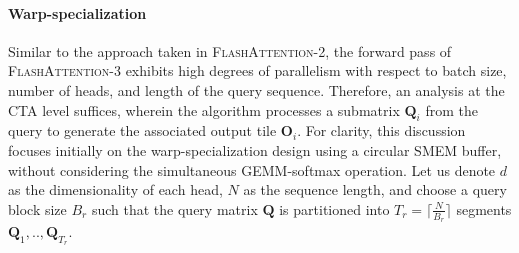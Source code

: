 \paragraph{Warp-specialization}
Similar to the approach taken in \textsc{FlashAttention-2}, the forward pass of \textsc{FlashAttention-3} exhibits high degrees of parallelism with respect to batch size, number of heads, and length of the query sequence. Therefore, an analysis at the CTA level suffices, wherein the algorithm processes a submatrix $\mathbf{Q}_i$ from the query to generate the associated output tile $\mathbf{O}_i$. For clarity, this discussion focuses initially on the warp-specialization design using a circular SMEM buffer, without considering the simultaneous GEMM-softmax operation. Let us denote $d$ as the dimensionality of each head, $N$ as the sequence length, and choose a query block size $B_r$ such that the query matrix $\mathbf{Q}$ is partitioned into $T_r = \lceil \frac{N}{B_r} \rceil$ segments $\mathbf{Q}_1, .., \mathbf{Q}_{T_r}$.

